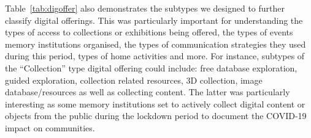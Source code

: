 \documentclass{egpubl}
\begin{document}
Table~\ref{tab:digoffer} also demonstrates the subtypes we designed to further classify digital offerings. This was particularly important for understanding the types of access to collections or exhibitions being offered, the types of events memory institutions organised, the types of communication strategies they used during this period, types of home activities and more. For instance, subtypes of the ``Collection'' type digital offering could include: free database exploration, guided exploration, collection related resources, 3D collection, image database/resources as well as collecting content. The latter was particularly interesting as some memory institutions set to actively collect digital content or objects from the public during the lockdown period to document the COVID-19 impact on communities.

\begin{table}
\small                    %
\setlength\tabcolsep{4pt} %
\centering

\begin{tabular}{
	| l | l |}



\end{tabular}
\end{table}
\end{document}
